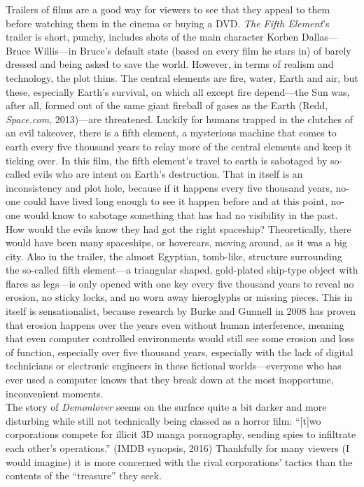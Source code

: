 \documentclass[12pt,a4paper]{article}
\begin{document}
Trailers of films are a good way for viewers to see that they appeal
to them before watching them in the cinema or buying a DVD.
\textit{The Fifth Element}'s trailer is short, punchy, includes shots
of the main character Korben Dallas---Bruce Willis---in Bruce's
default state (based on every film he stars in) of barely dressed and
being asked to save the world. However, in terms of realism and
technology, the plot thins. The central elements are fire, water,
Earth and air, but these, especially Earth's survival, on which all
except fire depend---the Sun was, after all, formed out of the same
giant fireball of gases as the Earth (Redd, \textit{Space.com},
2013)---are threatened. Luckily for humans trapped in the clutches of
an evil takeover, there is a fifth element, a mysterious machine that
comes to earth every five thousand years to relay more of the central
elements and keep it ticking over. In this film, the fifth element's
travel to earth is sabotaged by so-called evils who are intent on
Earth's destruction. That in itself is an inconsistency and plot hole,
because if it happens every five thousand years, no-one could have
lived long enough to see it happen before and at this point, no-one
would know to sabotage something that has had no visibility in the
past. How would the evils know they had got the right spaceship?
Theoretically, there would have been many spaceships, or hovercars,
moving around, as it was a big city. Also in the trailer, the almost
Egyptian, tomb-like, structure surrounding the so-called fifth
element---a triangular shaped, gold-plated ship-type object with
flares as legs---is only opened with one key every five thousand years
to reveal no erosion, no sticky locks, and no worn away hieroglyphs or
missing pieces. This in itself is sensationalist, because research by
Burke and Gunnell in 2008 has proven that erosion happens over the
years even without human interference, meaning that even computer
controlled environments would still see some erosion and loss of
function, especially over five thousand years, especially with the
lack of digital technicians or electronic engineers in these fictional
worlds---everyone who has ever used a computer knows that they break
down at the most inopportune, inconvenient moments.\\

The story of \textit{Demonlover} seems on the surface quite a bit
darker and more disturbing while still not technically being classed
as a horror film: ``[t]wo corporations compete for illicit 3D manga
pornography, sending spies to infiltrate each other's operations.''
(IMDB synopsis, 2016) Thankfully for many viewers (I would imagine) it
is more concerned with the rival corporations' tactics than the
contents of the ``treasure'' they seek.\\
\end{document}
